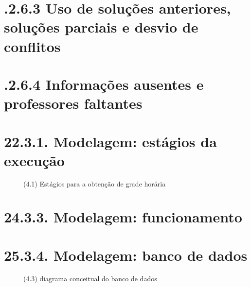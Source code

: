 \chapter*{.2.6.3 Uso de soluções anteriores, soluções parciais e desvio de conflitos}

\cite{Burke2000}

\cite{Arratia2021, Miranda2012, Piechowiak2004}

\chapter*{.2.6.4 Informações ausentes e professores faltantes}

\cite{Arratia2021}


\chapter{22.3.1. Modelagem: estágios da execução}

\cite{Miranda2012}

\begin{figure}[htpb]\caption{(4.1) Estágios para a obtenção de grade horária} \end{figure}




\chapter*{24.3.3. Modelagem: funcionamento}

\chapter*{25.3.4. Modelagem: banco de dados}

\begin{figure}[htpb]\caption{(4.3) diagrama conceitual do banco de dados}\end{figure}


